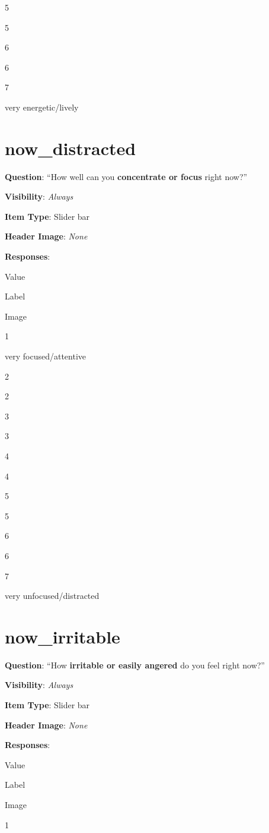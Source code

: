 \documentclass[]{book}
\begin{document}
5

5

6

6

7

very energetic/lively

\hypertarget{now_distracted}{%
\section{now\_distracted}\label{now_distracted}}

\textbf{Question}: ``How well can you \textbf{concentrate or focus} right now?''

\textbf{Visibility}: \emph{Always}

\textbf{Item Type}: Slider bar

\textbf{Header Image}: \emph{None}

\textbf{Responses}:

Value

Label

Image

1

very focused/attentive

2

2

3

3

4

4

5

5

6

6

7

very unfocused/distracted

\hypertarget{now_irritable}{%
\section{now\_irritable}\label{now_irritable}}

\textbf{Question}: ``How \textbf{irritable or easily angered} do you feel right now?''

\textbf{Visibility}: \emph{Always}

\textbf{Item Type}: Slider bar

\textbf{Header Image}: \emph{None}

\textbf{Responses}:

Value

Label

Image

1
\end{document}
